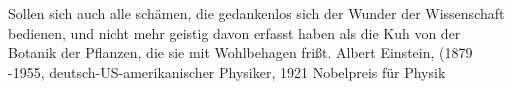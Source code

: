 {Sollen sich auch alle schämen, die gedankenlos sich der Wunder der Wissenschaft bedienen, und nicht mehr geistig davon erfasst haben als die Kuh von der Botanik der Pflanzen, die sie mit Wohlbehagen frißt.}
{Albert Einstein, (1879 -1955, deutsch-US-amerikanischer Physiker, 1921 Nobelpreis für Physik}



\vfill
{}
\newpage




